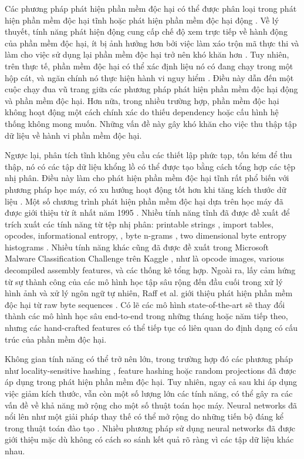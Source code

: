 Các phương pháp phát hiện phần mềm độc hại có thể được phân loại trong phát hiện phần mềm độc hại tĩnh hoặc phát hiện phần mềm độc hại động \cite{egele2012survey}.
Về lý thuyết, tính năng phát hiện động cung cấp chế độ xem trực tiếp về hành động của phần mềm độc hại, ít bị ảnh hưởng hơn bởi việc làm xáo trộn mã thực thi và làm cho việc sử dụng lại phần mềm độc hại trở nên khó khăn hơn \cite{moser2007limits}.
Tuy nhiên, trên thực tế, phần mềm độc hại có thể xác định liệu nó có đang chạy trong một hộp cát, và ngăn chính nó thực hiện hành vi nguy hiểm \cite{vidas2014evading}.
Điều này dẫn đến một cuộc chạy đua vũ trang giữa các phương pháp phát hiện phần mềm độc hại động và phần mềm độc hại.
Hơn nữa, trong nhiều trường hợp, phần mềm độc hại không hoạt động một cách chính xác do thiếu dependency hoặc cấu hình hệ thống không mong muốn.
Những vấn đề này gây khó khăn cho việc thu thập tập dữ liệu về hành vi phần mềm độc hại.

Ngược lại, phân tích tĩnh không yêu cầu các thiết lập phức tạp, tốn kém để thu thập, nó có các tập dữ liệu khổng lồ có thể được tạo bằng cách tổng hợp các tệp nhị phân.
Điều này làm cho phát hiện phần mềm độc hại tĩnh rất phổ biến với phương pháp học máy, có xu hướng hoạt động tốt hơn khi tăng kích thước dữ liệu \cite{banko2001scaling}.
Một số chương trình phát hiện phần mềm độc hại dựa trên học máy đã được giới thiệu từ ít nhất năm 1995 \cite{kephart1995biologically,schultz2001data,kolter2006learning,Shafiq2009AFF,saxe2015deep}.
Nhiều tính năng tĩnh đã được đề xuất để trích xuất các tính năng từ tệp nhị phân: printable  strings \cite{schultz2001data}, import tables, opcodes, informational entropy, \cite{weber2002toolkit}, byte n-grams \cite{abou2004n}, two dimensional byte entropy histograms \cite{saxe2015deep}.
Nhiều tính năng khác cũng đã được đề xuất trong Microsoft Malware Classification Challenge trên Kaggle \cite{ronen2018microsoft}, như là opcode images, various decompiled assembly features, và các thống kê tổng hợp.
Ngoài ra, lấy cảm hứng từ sự thành công của các mô hình học tập sâu rộng đến đầu cuối trong xử lý hình ảnh và xử lý ngôn ngữ tự nhiên, Raff et al. giới thiệu phát hiện phần mềm độc hại từ raw byte sequences \cite{raff2017malware}.
Có lẽ các mô hình state-of-the-art sẽ thay đổi thành các mô hình học sâu end-to-end trong những tháng hoặc năm tiếp theo, nhưng các hand-crafted features có thể tiếp tục có liên quan do định dạng có cấu trúc của phần mềm độc hại.

Không gian tính năng có thể trở nên lớn, trong trường hợp đó các phương pháp như locality-sensitive hashing \cite{bayer2009scalable}, feature hashing \cite{jang2011bitshred} hoặc random projections \cite{fradkin2003experiments}đã được áp dụng trong phát hiện phần mềm độc hại.
Tuy nhiên, ngay cả sau khi áp dụng việc giảm kích thước, vẫn còn một số lượng lớn các tính năng, có thể gây ra các vấn đề về khả năng mở rộng cho một số thuật toán học máy. 
Neural networks đã nổi lên như một giải pháp thay thế có thể mở rộng do những tiến bộ đáng kể trong thuật toán đào tạo \cite{almasi2016review}.
Nhiều phương pháp sử dụng neural networks đã được giới thiệu \cite{saxe2015deep, dahl2013large, kephart1995biologically, benchea2014combining} mặc dù không có cách so sánh kết quả rõ ràng vì các tập dữ liệu khác nhau.

